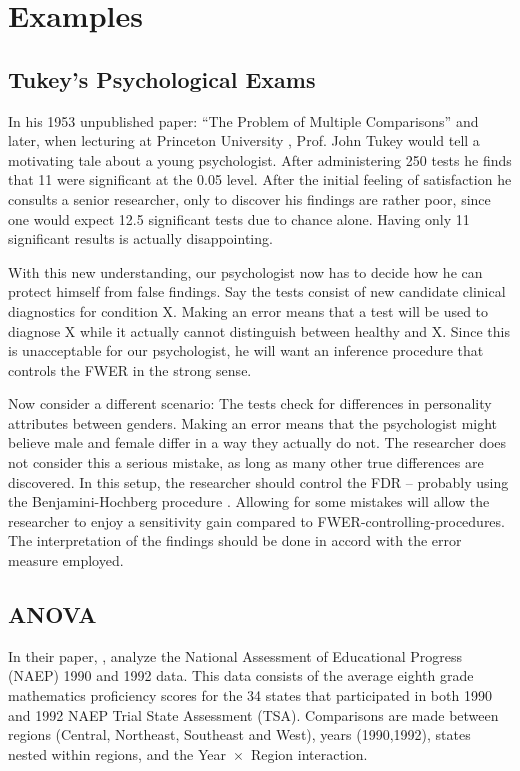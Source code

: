 \documentclass[review,12pt]{article}
\theoremstyle{definition}
\begin{document}
\section{\label{sec:examples}Examples}




\subsection{Tukey's Psychological Exams}
In his 1953 unpublished paper: ``The Problem of Multiple Comparisons'' \citep{benjamini_john_2002} and later, when lecturing at Princeton University \citep{donoho_higher_2004}, Prof. John Tukey would tell a motivating tale about a young psychologist. After administering 250 tests he finds that 11 were significant at the 0.05 level. After the initial feeling of satisfaction he consults a senior researcher, only to discover his findings are rather poor, since one  would expect 12.5 significant tests due to chance alone. Having only 11 significant results is actually disappointing.


With this new understanding, our psychologist now has to decide how he can protect himself from false findings. 
Say the tests consist of new candidate clinical diagnostics for condition X. Making an error means that a test will be used to diagnose X while it actually cannot distinguish between healthy and X. Since this is unacceptable for our psychologist, he will want an inference procedure that controls the FWER in the strong sense. 


Now consider a different scenario: The tests check for differences in personality attributes between genders. Making an error means that the psychologist might believe male and female differ in a way they actually do not. The researcher does not consider this a serious mistake, as long as many other true differences are discovered. In this setup, the researcher should control the FDR -- probably using the Benjamini-Hochberg procedure \citep{benjamini_controlling_1995}. Allowing for some mistakes will allow the researcher to enjoy a sensitivity gain compared to FWER-controlling-procedures. The interpretation of the findings should be done in accord with the error measure employed.


\subsection{\label{sec:anova}ANOVA}
In their \citeyear{williams_controlling_1999} paper, \citeauthor*{williams_controlling_1999}, analyze the National Assessment of Educational Progress (NAEP) 1990 and 1992 data. This data consists of the average eighth grade mathematics proficiency scores for the 34 states that participated in both 1990 and 1992 NAEP Trial State Assessment (TSA). Comparisons are made between regions (Central, Northeast, Southeast and West), years (1990,1992), states nested within regions, and the Year~$\times$~Region interaction. 
\end{document}
